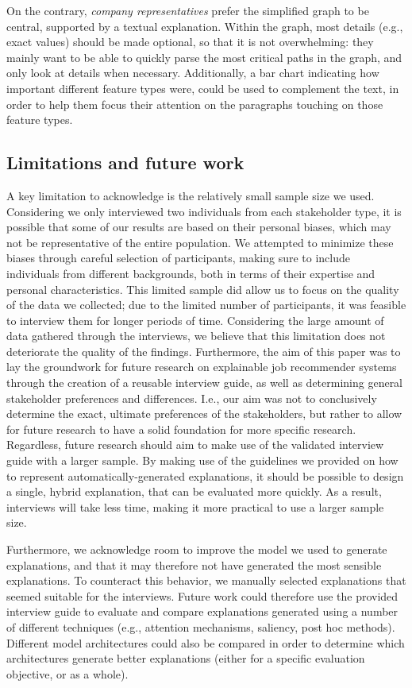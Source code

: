 On the contrary, \textit{company representatives} prefer the simplified graph to be central, supported by a textual explanation. Within the graph, most details (e.g., exact values) should be made optional, so that it is not overwhelming: they mainly want to be able to quickly parse the most critical paths in the graph, and only look at details when necessary. Additionally, a bar chart indicating how important different feature types were, could be used to complement the text, in order to help them focus their attention on the paragraphs touching on those feature types. 


\subsection{Limitations and future work}
A key limitation to acknowledge is the relatively small sample size we used. Considering we only interviewed two individuals from each stakeholder type, it is possible that some of our results are based on their personal biases, which may not be representative of the entire population. We attempted to minimize these biases through careful selection of participants, making sure to include individuals from different backgrounds, both in terms of their expertise and personal characteristics. This limited sample did allow us to focus on the quality of the data we collected; due to the limited number of participants, it was feasible to interview them for longer periods of time. Considering the large amount of data gathered through the interviews, we believe that this limitation does not deteriorate the quality of the findings. Furthermore, the aim of this paper was to lay the groundwork for future research on explainable job recommender systems through the creation of a reusable interview guide, as well as determining general stakeholder preferences and differences. I.e., our aim was not to conclusively determine the exact, ultimate preferences of the stakeholders, but rather to allow for future research to have a solid foundation for more specific research. Regardless, future research should aim to make use of the validated interview guide with a larger sample. By making use of the guidelines we provided on how to represent automatically-generated explanations, it should be possible to design a single, hybrid explanation, that can be evaluated more quickly. As a result, interviews will take less time, making it more practical to use a larger sample size. 

Furthermore, we acknowledge room to improve the model we used to generate explanations, and that it may therefore not have generated the most sensible explanations. To counteract this behavior, we manually selected explanations that seemed suitable for the interviews. %
Future work could therefore use the provided interview guide to evaluate and compare explanations generated using a number of different techniques (e.g., attention mechanisms, saliency, post hoc methods). Different model architectures could also be compared in order to determine which architectures generate better explanations (either for a specific evaluation objective, or as a whole). 


